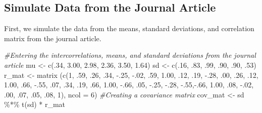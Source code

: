 \documentclass[
  english,
]{book}
\newenvironment{Shaded}{\begin{snugshade}}{\end{snugshade}}
\newcommand{\AttributeTok}[1]{\textcolor[rgb]{0.77,0.63,0.00}{#1}}
\newcommand{\CommentTok}[1]{\textcolor[rgb]{0.56,0.35,0.01}{\textit{#1}}}
\newcommand{\DecValTok}[1]{\textcolor[rgb]{0.00,0.00,0.81}{#1}}
\newcommand{\FloatTok}[1]{\textcolor[rgb]{0.00,0.00,0.81}{#1}}
\newcommand{\FunctionTok}[1]{\textcolor[rgb]{0.00,0.00,0.00}{#1}}
\newcommand{\NormalTok}[1]{#1}
\newcommand{\OtherTok}[1]{\textcolor[rgb]{0.56,0.35,0.01}{#1}}
\newcommand{\SpecialCharTok}[1]{\textcolor[rgb]{0.00,0.00,0.00}{#1}}
\begin{document}
\hypertarget{simulate-data-from-the-journal-article-1}{%
\subsection{Simulate Data from the Journal Article}\label{simulate-data-from-the-journal-article-1}}

First, we simulate the data from the means, standard deviations, and correlation matrix from the journal article.

\begin{Shaded}
\begin{Highlighting}[]
\CommentTok{\#Entering the intercorrelations, means, and standard deviations from the journal article}
\NormalTok{mu }\OtherTok{\textless{}{-}} \FunctionTok{c}\NormalTok{(.}\DecValTok{34}\NormalTok{, }\FloatTok{3.00}\NormalTok{, }\FloatTok{2.98}\NormalTok{, }\FloatTok{2.36}\NormalTok{, }\FloatTok{3.50}\NormalTok{, }\FloatTok{1.64}\NormalTok{)}
\NormalTok{sd }\OtherTok{\textless{}{-}} \FunctionTok{c}\NormalTok{(.}\DecValTok{16}\NormalTok{, .}\DecValTok{83}\NormalTok{, .}\DecValTok{99}\NormalTok{, .}\DecValTok{90}\NormalTok{, .}\DecValTok{90}\NormalTok{, .}\DecValTok{53}\NormalTok{)}
\NormalTok{r\_mat }\OtherTok{\textless{}{-}} \FunctionTok{matrix}\NormalTok{ (}\FunctionTok{c}\NormalTok{(}\DecValTok{1}\NormalTok{,   .}\DecValTok{59}\NormalTok{, .}\DecValTok{26}\NormalTok{,   .}\DecValTok{34}\NormalTok{,  }\SpecialCharTok{{-}}\NormalTok{.}\DecValTok{25}\NormalTok{, }\SpecialCharTok{{-}}\NormalTok{.}\DecValTok{02}\NormalTok{,}
\NormalTok{                  .}\DecValTok{59}\NormalTok{, }\FloatTok{1.00}\NormalTok{, .}\DecValTok{12}\NormalTok{,   .}\DecValTok{19}\NormalTok{,  }\SpecialCharTok{{-}}\NormalTok{.}\DecValTok{28}\NormalTok{, .}\DecValTok{00}\NormalTok{, }
\NormalTok{                  .}\DecValTok{26}\NormalTok{,  .}\DecValTok{12}\NormalTok{, }\FloatTok{1.00}\NormalTok{, .}\DecValTok{66}\NormalTok{,  }\SpecialCharTok{{-}}\NormalTok{.}\DecValTok{55}\NormalTok{, .}\DecValTok{07}\NormalTok{,}
\NormalTok{                  .}\DecValTok{34}\NormalTok{,  .}\DecValTok{19}\NormalTok{, .}\DecValTok{66}\NormalTok{,  }\FloatTok{1.00}\NormalTok{, }\SpecialCharTok{{-}}\NormalTok{.}\DecValTok{66}\NormalTok{, .}\DecValTok{05}\NormalTok{,}
                 \SpecialCharTok{{-}}\NormalTok{.}\DecValTok{25}\NormalTok{, }\SpecialCharTok{{-}}\NormalTok{.}\DecValTok{28}\NormalTok{, }\SpecialCharTok{{-}}\NormalTok{.}\DecValTok{55}\NormalTok{,}\SpecialCharTok{{-}}\NormalTok{.}\DecValTok{66}\NormalTok{,  }\FloatTok{1.00}\NormalTok{, .}\DecValTok{08}\NormalTok{, }
                 \SpecialCharTok{{-}}\NormalTok{.}\DecValTok{02}\NormalTok{,  .}\DecValTok{00}\NormalTok{,  .}\DecValTok{07}\NormalTok{, .}\DecValTok{05}\NormalTok{, .}\DecValTok{08}\NormalTok{,  }\DecValTok{1}\NormalTok{), }\AttributeTok{ncol =} \DecValTok{6}\NormalTok{)}
\CommentTok{\#Creating a covariance matrix}
\NormalTok{cov\_mat }\OtherTok{\textless{}{-}}\NormalTok{ sd }\SpecialCharTok{\%*\%} \FunctionTok{t}\NormalTok{(sd) }\SpecialCharTok{*}\NormalTok{ r\_mat}


\end{Highlighting}
\end{Shaded}
\end{document}
